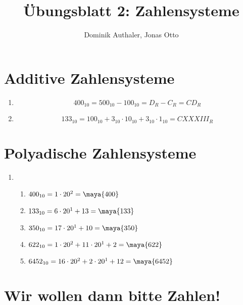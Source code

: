 \documentclass[a4paper]{article}
\author{Dominik Authaler, Jonas Otto}
\title{Übungsblatt 2: Zahlensysteme}
\begin{document}
\maketitle

\section{Additive Zahlensysteme}

\begin{enumerate}[label=\Roman*)]
    \item
        \begin{equation}
            400_{10} = 500_{10} - 100_{10} = D_R - C_R = \textit{CD}_R
        \end{equation}
    \item
        \begin{equation}
            133_{10} = 100_{10} + 3_{10} \cdot 10_{10} + 3_{10} \cdot 1_{10} = \textit{CXXXIII}_R
        \end{equation}
        
\end{enumerate}

\section{Polyadische Zahlensysteme}
\begin{enumerate}[label=\alph*)]
    \item
        \begin{enumerate}[label=\Roman*)]
            \item $ 400_{10} = 1 \cdot 20^2 = \maya{400} $ 

            \item $ 133_{10} = 6 \cdot 20^1 + 13 = \maya{133} $ 

            \item $ 350_{10} = 17 \cdot 20^1 + 10 = \maya{350} $ 

            \item $ 622_{10} = 1 \cdot 20^2 + 11 \cdot 20^1 + 2 = \maya{622} $ 

            \item $ 6452_{10} = 16 \cdot 20^2 + 2 \cdot 20^1 + 12 = \maya{6452} $ 
        \end{enumerate}
\end{enumerate}

\section{Wir wollen dann bitte Zahlen!}
\end{document}
